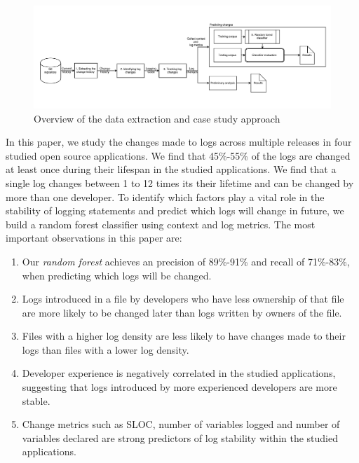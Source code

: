\begin{figure}
	\centering
	\includegraphics[width=1\textwidth,
	height=.4\textwidth]{LogGenalogyMethdology}
	\caption{Overview of the data extraction and case study approach}
	\label{fig:LGmethod}
\end{figure}


In this paper, we study the changes made to logs across multiple releases in four studied open source applications. We find that 45\%-55\% of the logs are changed at least once during their lifespan in the studied applications. We find that a single log changes between 1 to 12 times its their lifetime and can be changed by more than one developer. To identify which factors play a vital role in the stability of logging statements and predict which logs will change in future, we build a random forest classifier using context and log metrics. The most important observations in this paper are:
\begin{enumerate}
	\item  Our \textsl{random forest} achieves an precision of 89\%-91\% and recall of 71\%-83\%, when predicting which logs will be changed.
	\item Logs introduced in a file by developers who have less ownership of that file are more likely to be changed later than logs written by owners of the file. 
	\item Files with a higher log density are less likely to have changes made to their logs than files with a lower log density.
	\item Developer experience is negatively correlated in the studied applications, suggesting that logs introduced by more experienced developers are more stable. 
	\item Change metrics such as SLOC, number of variables logged and number of variables declared are strong predictors of log stability within the studied applications. 

\end{enumerate}



